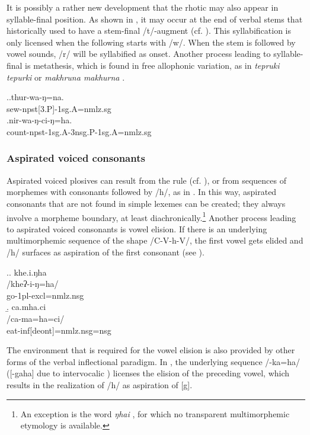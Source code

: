 It is possibly a rather new development that the rhotic may also appear in syllable-final position. As shown in  \Next, it may occur at the end of verbal stems that historically used to have a stem-final /t/-augment (cf. ). This syllabification is only licensed when the following  starts with /w/. When the stem is followed by vowel sounds, /r/ will be syllabified as onset. Another process leading to syllable-final  is metathesis, which is found in free allophonic variation, as in \emph{tepruki \ti tepurki}  or \emph{makhruna \ti makhurna} . 


\ex.\ag.thur-wa-ŋ=na.\\
sew{\sc -npst[3.P]-1sg.A=nmlz.sg}\\
\bg.nir-wa-ŋ-ci-ŋ=ha.\\
count{\sc -npst-1sg.A-3nsg.P-1sg.A=nmlz.sg}\\


 
\subsubsection{Aspirated voiced consonants}\label{asp-voiced}

Aspirated voiced plosives can result from the  rule (cf. ), or from sequences of morphemes with consonants followed by /h/, as in \Next[a]. In this way, aspirated consonants that are not found in simple lexemes can be created; they always involve a morpheme boundary, at least diachronically.\footnote{An exception is the word \emph{ŋhai} , for which no transparent multimorphemic etymology is available.} Another process leading to aspirated voiced consonants is vowel elision. If there is an underlying multimorphemic sequence of the shape /C-V-h-V/, the first vowel gets elided and /h/ surfaces as aspiration of the first consonant (see \Next[b]). 


\ex.\a. \glll khe.i.ŋha\\
/kheʔ-i-ŋ=ha/\\
go{\sc [pst]-1pl-excl=nmlz.nsg}\\
\b. \glll ca.mha.ci\\
/ca-ma=ha=ci/\\
eat{\sc -inf[deont]=nmlz.nsg=nsg}\\


The environment that is required for the vowel elision is also provided by other forms of the verbal inflectional paradigm. In \Next, the underlying sequence /-ka=ha/ ([-gaha] due to intervocalic ) licenses the elision of the preceding vowel, which results in the realization of /h/ as aspiration of [g].

